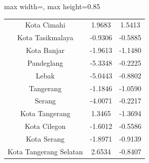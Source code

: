 \begin{table}[H]
\begin{adjustbox}{max width=\textwidth, max height=0.85\textheight}
\begin{tabular}{|c|c|c|}
Kota Cimahi & 1.9683 & 1.5413 \\
Kota Tasikmalaya & -0.9306 & -0.5885 \\
Kota Banjar & -1.9613 & -1.1480 \\
Pandeglang & -5.3348 & -0.2225 \\
Lebak & -5.0443 & -0.8802 \\
Tangerang & -1.1846 & -1.0590 \\
Serang & -4.0071 & -0.2217 \\
Kota Tangerang & 1.3465 & -1.3694 \\
Kota Cilegon & -1.6012 & -0.5586 \\
Kota Serang & -1.8971 & -0.9139 \\
Kota Tangerang Selatan & 2.6534 & -0.8407 \\
\hline
\end{tabular}
\end{adjustbox}
\end{table}